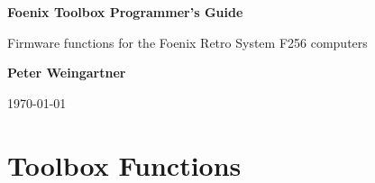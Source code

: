 \documentclass[10pt]{book}
\begin{document}
\lstset{language=C,basicstyle=\small,showstringspaces=false,columns=fullflexible,stringstyle=\ttfamily}

\begin{titlepage}
	\begin{center}
		\vspace*{1cm}
 
		\textbf{\Large Foenix Toolbox Programmer's Guide}
 
		\vspace{0.5cm}
		
		Firmware functions for the Foenix Retro System F256 computers
			 
		\vspace{1.5cm}
 
		\textbf{Peter Weingartner}
 
		\vfill
	  
		\today
			 
	\end{center}
\end{titlepage}




\chapter{Toolbox Functions}






\end{document}
